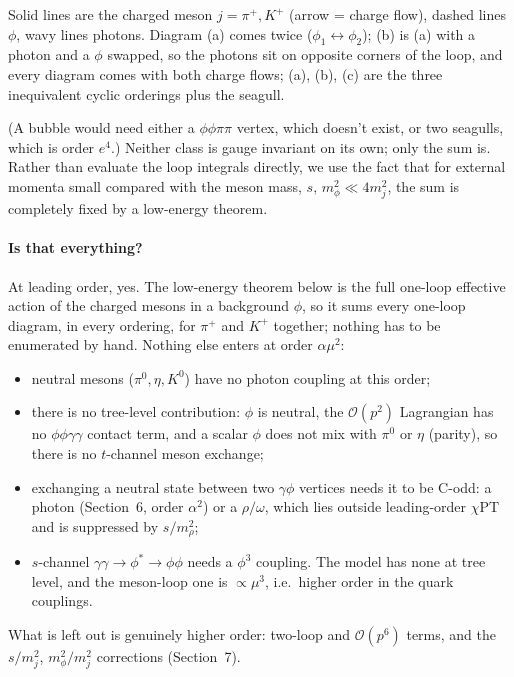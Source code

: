 \documentclass[11pt]{article}
\begin{document}
{\small Solid lines are the charged meson $j=\pi^+,K^+$ (arrow = charge
flow), dashed lines $\phi$, wavy lines photons. Diagram (a) comes twice
($\phi_1\leftrightarrow\phi_2$); (b) is (a) with a photon and a $\phi$ swapped, so the photons sit on opposite corners of the loop, and every diagram comes with both charge flows;
(a), (b), (c) are the three inequivalent cyclic orderings plus the seagull.}

(A bubble would need either a $\phi\phi\pi\pi$ vertex, which doesn't exist, or
two seagulls, which is order $e^4$.) Neither class is gauge invariant on its
own; only the sum is. Rather than evaluate the loop integrals directly, we use
the fact that for external momenta small compared with the meson mass,
$s,\,m_\phi^2\ll 4m_j^2$, the sum is completely fixed by a low-energy theorem.

\paragraph{Is that everything?} At leading order, yes. The low-energy theorem
below is the full one-loop effective action of the charged mesons in a
background $\phi$, so it sums every one-loop diagram, in every ordering, for
$\pi^+$ and $K^+$ together; nothing has to be enumerated by hand. Nothing else
enters at order $\alpha\mu^2$:
\begin{itemize}\itemsep2pt
  \item neutral mesons ($\pi^0,\eta,K^0$) have no photon coupling at this order;
  \item there is no tree-level contribution: $\phi$ is neutral, the
        $\mathcal O(p^2)$ Lagrangian has no $\phi\phi\gamma\gamma$ contact term,
        and a scalar $\phi$ does not mix with $\pi^0$ or $\eta$ (parity), so
        there is no $t$-channel meson exchange;
  \item exchanging a neutral state between two $\gamma\phi$ vertices needs it
        to be C-odd: a photon (Section~6, order $\alpha^2$) or a $\rho/\omega$,
        which lies outside leading-order $\chi$PT and is suppressed by
        $s/m_\rho^2$;
  \item $s$-channel $\gamma\gamma\to\phi^*\to\phi\phi$ needs a $\phi^3$
        coupling. The model has none at tree level, and the meson-loop one is
        $\propto\mu^3$, i.e.\ higher order in the quark couplings.
\end{itemize}
What is left out is genuinely higher order: two-loop and $\mathcal O(p^6)$
terms, and the $s/m_j^2$, $m_\phi^2/m_j^2$ corrections (Section~7).
\end{document}
